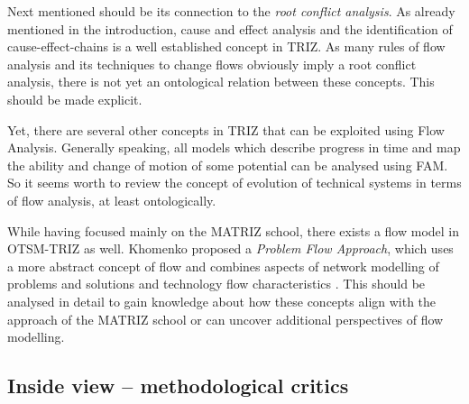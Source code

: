 \documentclass[a4paper,11pt]{article}
\begin{document}
Next mentioned should be its connection to the \emph{root conflict analysis}.
As already mentioned in the introduction, cause and effect analysis and the
identification of cause-effect-chains is a well established concept in TRIZ.
As many rules of flow analysis and its techniques to change flows obviously
imply a root conflict analysis, there is not yet an ontological relation
between these concepts.  This should be made explicit.

Yet, there are several other concepts in TRIZ that can be exploited using Flow
Analysis. Generally speaking, all models which describe progress in time and
map the ability and change of motion of some potential can be analysed using
FAM. So it seems worth to review the concept of evolution of technical systems
in terms of flow analysis, at least ontologically.

While having focused mainly on the MATRIZ school, there exists a flow model in
OTSM-TRIZ as well. Khomenko proposed a \emph{Problem Flow Approach}, which
uses a more abstract concept of flow and combines aspects of network modelling
of problems and solutions and technology flow characteristics
\cite{Khomenko2007} \cite{KhomenkoFlow-1} \cite{KhomenkoFlow-2}.  This should
be analysed in detail to gain knowledge about how these concepts align with
the approach of the MATRIZ school or can uncover additional perspectives of
flow modelling.

\subsection{Inside view -- methodological critics}
\end{document}
